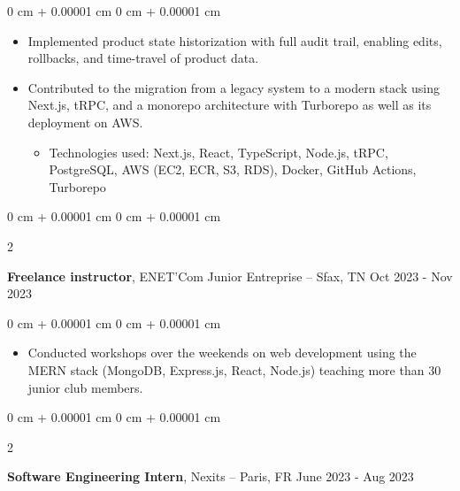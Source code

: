 \documentclass[10pt, letterpaper]{article}
\newenvironment{highlights}{
  \begin{itemize}[
    topsep=0.10 cm,
    parsep=0.10 cm,
    partopsep=0pt,
    itemsep=0pt,
    leftmargin=0 cm + 10pt
    ]
  }{
\end{itemize}
}
\newenvironment{highlightsforbulletentries}{
  \begin{itemize}[
    topsep=0.10 cm,
    parsep=0.10 cm,
    partopsep=0pt,
    itemsep=0pt,
    leftmargin=10pt
    ]
  }{
\end{itemize}
} %
\newenvironment{onecolentry}{
  \begin{adjustwidth}{
      0 cm + 0.00001 cm
    }{
      0 cm + 0.00001 cm
    }
  }{
  \end{adjustwidth}
} %
\newenvironment{twocolentry}[2][]{
  \onecolentry
  \def\secondColumn{#2}
  \setcolumnwidth{\fill, 4.5 cm}
  \begin{paracol}{2}
  }{
    \switchcolumn \raggedleft \secondColumn
  \end{paracol}
  \end{onecolentry}
} %
\begin{document}
  \vspace{0.10 cm}
  \begin{onecolentry}
    \begin{highlights}

    \item Implemented product state historization with full audit trail, enabling edits, rollbacks, and time-travel of product data.

    \item Contributed to the migration from a legacy system to a modern stack using Next.js, tRPC, and a monorepo architecture with Turborepo as well as its deployment on AWS.

                \begin{highlightsforbulletentries}
    \item Technologies used: Next.js, React, TypeScript, Node.js, tRPC, PostgreSQL, AWS (EC2, ECR, S3, RDS), Docker, GitHub Actions, Turborepo
    \end{highlightsforbulletentries}


    \end{highlights}

  \end{onecolentry}


    \begin{twocolentry}{
      Oct 2023 - Nov 2023
    }
  \textbf{Freelance instructor}, ENET’Com Junior Entreprise  -- Sfax, TN\end{twocolentry}

  \vspace{0.10 cm}
  \begin{onecolentry}
    \begin{highlights}

    \item Conducted workshops over the weekends on web development using the MERN stack (MongoDB, Express.js, React, Node.js) teaching more than 30 junior club members.


    \end{highlights}

  \end{onecolentry}




  \begin{twocolentry}{
      June 2023 - Aug 2023
    }
  \textbf{Software Engineering Intern}, Nexits  -- Paris, FR\end{twocolentry}

\end{document}
